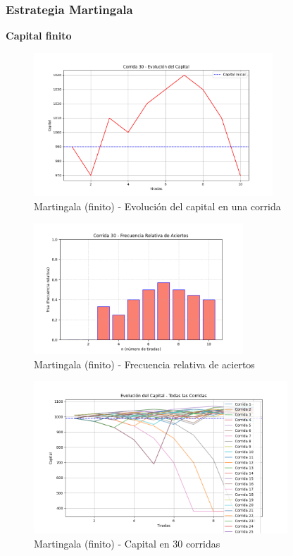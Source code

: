 \documentclass{article}
\begin{document}
\vspace{0.5cm}

\subsubsection*{Estrategia Martingala}

\textbf{Capital finito}

\begin{figure}
    \centering
    \includegraphics[width=0.8\textwidth]{./images/capital_corrida_30_m_f.png}
    \caption{Martingala (finito) - Evolución del capital en una corrida}
\end{figure}

\begin{figure}
    \centering
    \includegraphics[width=0.7\textwidth]{./images/frsa_corrida_30_m_f.png}
    \caption{Martingala (finito) - Frecuencia relativa de aciertos}
\end{figure}

\begin{figure}
    \centering
    \includegraphics[width=0.85\textwidth]{./images/capital_todas_corridas_m_f.png}
    \caption{Martingala (finito) - Capital en 30 corridas}
\end{figure}
\end{document}
